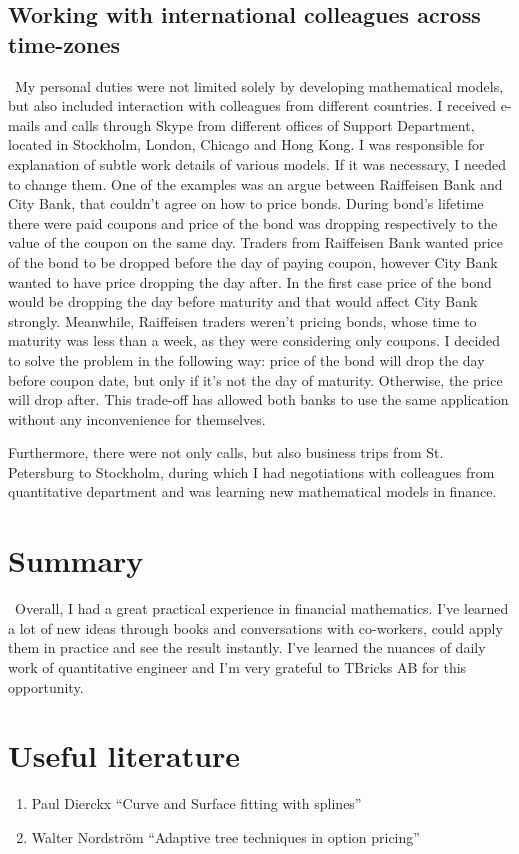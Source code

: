 \documentclass[]{article}
\begin{document}
\subsection*{Working with international colleagues across time-zones} \
My personal duties were not limited solely by developing mathematical models, but also included interaction with colleagues from different countries. I received e-mails and calls through Skype from different offices of Support Department, located in Stockholm, London, Chicago and Hong Kong. I was responsible for explanation of subtle work details of various models. If it was necessary, I needed to change them. One of the examples was an argue between Raiffeisen Bank and City Bank, that couldn't agree on how to price bonds. During bond's lifetime there were paid coupons and price of the bond was dropping respectively to the value of the coupon on the same day. Traders from Raiffeisen Bank wanted price of the bond to be dropped before the day of paying coupon, however City Bank wanted to have price dropping the day after. In the first case price of the bond would be dropping the day before maturity and that would affect City Bank strongly. Meanwhile, Raiffeisen traders weren't pricing bonds, whose time to maturity was less than a week, as they were considering only coupons. I decided to solve the problem in the following way: price of the bond will drop the day before coupon date, but only if it's not the day of maturity. Otherwise, the price will drop after. This trade-off has allowed both banks to use the same application without any inconvenience for themselves.

Furthermore, there were not only calls, but also business trips from St. Petersburg to Stockholm, during which I had negotiations with colleagues from quantitative department and was learning new mathematical models in finance.

\section{Summary}
\
Overall, I had a great practical experience in financial mathematics.
I've learned a lot of new ideas through books and conversations with co-workers, could apply them in practice and see the result instantly.
I've learned the nuances of daily work of quantitative engineer and I'm very grateful to TBricks AB for this opportunity.

\section{Useful literature}
\begin{enumerate}
	\item Paul Dierckx ``Curve and Surface fitting with splines''
	\item Walter Nordström ``Adaptive tree techniques in option pricing''
\end{enumerate}
\end{document}
